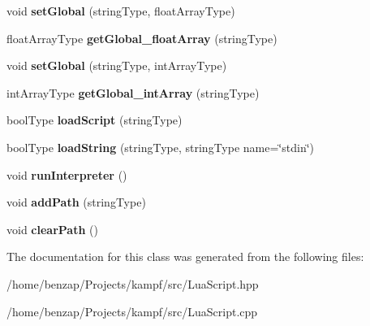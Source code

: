 \begin{DoxyCompactItemize}
\item 
\hypertarget{classLuaScript_a142daaab83c639d697bab8e9f71d6c3e}{void {\bfseries set\-Global} (string\-Type, float\-Array\-Type)}\label{classLuaScript_a142daaab83c639d697bab8e9f71d6c3e}

\item 
\hypertarget{classLuaScript_a9a84959f92a096a8c113bb76af97b2cd}{float\-Array\-Type {\bfseries get\-Global\-\_\-float\-Array} (string\-Type)}\label{classLuaScript_a9a84959f92a096a8c113bb76af97b2cd}

\item 
\hypertarget{classLuaScript_a3e3199d206a5630001717dbab6e830a2}{void {\bfseries set\-Global} (string\-Type, int\-Array\-Type)}\label{classLuaScript_a3e3199d206a5630001717dbab6e830a2}

\item 
\hypertarget{classLuaScript_a442c5be9b8b8db93a97b53d826da7773}{int\-Array\-Type {\bfseries get\-Global\-\_\-int\-Array} (string\-Type)}\label{classLuaScript_a442c5be9b8b8db93a97b53d826da7773}

\item 
\hypertarget{classLuaScript_ac2841f3eec20bbdff800b9b7edf169ba}{bool\-Type {\bfseries load\-Script} (string\-Type)}\label{classLuaScript_ac2841f3eec20bbdff800b9b7edf169ba}

\item 
\hypertarget{classLuaScript_ae9f8ff828615cdaaac5f209b66559256}{bool\-Type {\bfseries load\-String} (string\-Type, string\-Type name=\char`\"{}stdin\char`\"{})}\label{classLuaScript_ae9f8ff828615cdaaac5f209b66559256}

\item 
\hypertarget{classLuaScript_a25724daf77de8a3f5fb6b8231fa02a75}{void {\bfseries run\-Interpreter} ()}\label{classLuaScript_a25724daf77de8a3f5fb6b8231fa02a75}

\item 
\hypertarget{classLuaScript_aceb3ea35ef8734fc07f19a80e6756821}{void {\bfseries add\-Path} (string\-Type)}\label{classLuaScript_aceb3ea35ef8734fc07f19a80e6756821}

\item 
\hypertarget{classLuaScript_a0399de3e44909000c3478916474ef3d6}{void {\bfseries clear\-Path} ()}\label{classLuaScript_a0399de3e44909000c3478916474ef3d6}

\end{DoxyCompactItemize}


The documentation for this class was generated from the following files\-:\begin{DoxyCompactItemize}
\item 
/home/benzap/\-Projects/kampf/src/Lua\-Script.\-hpp\item 
/home/benzap/\-Projects/kampf/src/Lua\-Script.\-cpp\end{DoxyCompactItemize}
